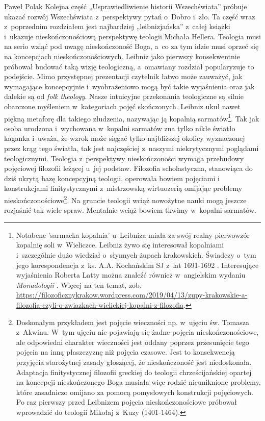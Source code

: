 \begin{recplenv}{Paweł Polak}
Kolejna część „Usprawiedliwienie historii Wszechświata” próbuje ukazać rozwój Wszechświata z~perspektywy pytań o~Dobro i~zło.
Ta część wraz z~poprzednim rozdziałem jest najbardziej „leibnizjańska” z~całej książki i~ukazuje
nieskończonościową perspektywę teologii Michała Hellera. Teologia musi na serio wziąć pod uwagę nieskończoność Boga, a~co
za tym idzie musi oprzeć się na koncepcjach nieskończonościowych. Lei\-bniz jako pierwszy konsekwentnie próbował
budować taką wizję teologiczną, a~omawiany rozdział popularyzuje to podejście. Mimo przystępnej prezentacji czytelnik
łatwo może zauważyć, jak wymagające koncepcyjnie i~wyobrażeniowo mogą być takie wyjaśnienia oraz jak dalekie są od
\textit{folk theology}. Nasze intuicyjne przekonania teologiczne są silnie obarczone
myśleniem w~kategoriach pojęć skończonych. Leibniz ukuł nawet piękną metaforę dla takiego złudzenia, nazywając ją
kopalnią sarmatów\footnote{Notabene 'sarmacka kopalnia' u~Leibniza miała za swój realny pierwowzór kopalnię soli w~Wieliczce.
Leibniz żywo się interesował kopalniami i~szczególnie dużo wiedział o~słynnych żupach krakowskich. Świadczy o~tym
jego korespondencja z~ks. A.A. Kochańskim SJ z~lat 1691-1692
\parencite{kochanski_korespondencja_2005,kochanski_korespondencja_2019}.
Interesujące wyjaśnienia Roberta Latty
można znaleźć również w~angielskim wydaniu \textit{Monadologii}
\parencite[s.~346]{leibniz_monadology_1898}.
Więcej na ten temat, zob.
\url{https://filozoficznykrakow.wordpress.com/2019/04/13/zupy-krakowskie-a-filozofia-czyli-o-zwiazkach-wielickiej-kopalni-z-filozofia}.
}.
Tak jak osoba urodzona i~wychowana w~kopalni sarmatów zna tylko nikłe światło kaganka i~uważa, że wzrok może sięgać
tylko najbliższej okolicy wyznaczonej przez krąg tego światła, tak jest najczęściej z~naszymi niekrytycznymi poglądami
teologicznymi. Teologia z~perspektywy nieskończoności wymaga przebudowy pojęciowej filozofii leżącej u~jej podstaw.
Filozofia scholastyczna, stanowiąca do dziś ukrytą bazę koncepcyjną teologii, operowała bowiem pojęciami i
konstrukcjami finitystycznymi z~mistrzowską wirtuozerią omijając problemy nieskończonościowe\footnote{Doskonałym
przykładem jest pojęcie wieczności np. w~ujęciu św. Tomasza z~Akwinu. W~tym ujęciu nie pojawiają się żadne pojęcia
nieskończonościowe, ale odpowiedni charakter wieczności jest oddany poprzez przesunięcie tego pojęcia na inną
płaszczyznę niż pojęcia czasowe. Jest to konsekwencją przyjęcia starożytnej zasady głoszącej, że nieskończoność jest
niedoskonała. Adaptacja finitystycznej filozofii greckiej do teologii chrześcijańskiej opartej na koncepcji
nieskończonego Boga musiała więc rodzić nieuniknione problemy, które zasadniczo omijano za pomocą pomysłowych
konstrukcji pojęciowych. Po raz pierwszy przed Leibnizem pojęcia nieskończonościowe próbował wprowadzić do teologii
Mikołaj z~Kuzy (1401-1464).}. Na gruncie teologii wciąż nowożytne nauki mogą jeszcze rozjaśnić tak wiele spraw.
Mentalnie wciąż bowiem tkwimy w~kopalni sarmatów.


\end{recplenv}
